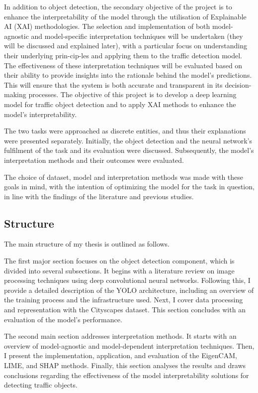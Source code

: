 In addition to object detection, the secondary objective of the project is to enhance the interpretability of the
model through the utilisation of Explainable AI (XAI) me\-tho\-do\-lo\-gies.
The selection and implementation of both model-agnostic and model-specific interpretation techniques will be undertaken (they will be discussed and explained later),
with a particular focus on understanding their underlying prin-cip-les and applying them to the traffic detection model.
The effectiveness of these interpretation techniques will be evaluated based on their
ability to provide insights into the rationale behind the model's predictions.
This will ensure that the system is both accurate and transparent in its decision-making processes.
The objective of this project is to develop a deep learning model for traffic object detection and to apply XAI methods to enhance the model's interpretability.

The two tasks were approached as discrete entities, and thus their explanations were presented separately.
Initially, the object detection and the neural network's fulfilment of the task and its evaluation were discussed.
Subsequently, the model's interpretation methods and their outcomes were evaluated.

The choice of dataset, model and interpretation methods was made with these goals in mind, with the intention of optimizing the model for the task in question, in line with the findings of the literature and previous studies.

\subsection{Structure}\label{subsec:Structure} %

The main structure of my thesis is outlined as follows.

The first major section focuses on the object detection component, which is divided into several subsections.
It begins with a literature review on image processing techniques using deep convolutional neural networks.
Following this, I provide a detailed description of the YOLO architecture, including an overview of the training process and the infrastructure used.
Next, I cover data processing and representation with the Cityscapes dataset. This section concludes with an evaluation of the model’s performance.

The second main section addresses interpretation methods.
It starts with an overview of model-agnostic and model-dependent interpretation techniques.
Then, I present the implementation, application, and evaluation of the EigenCAM, LIME, and SHAP methods.
Finally, this section analyses the results and draws conclusions regarding the effectiveness of the model interpretability solutions for detecting traffic objects.

\newpage